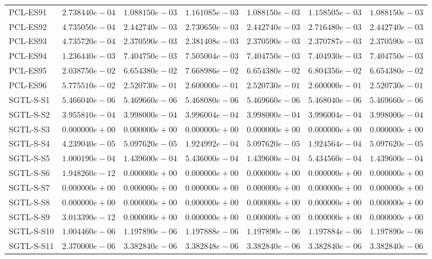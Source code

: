 \begin{longtable}{lrrrrrr}
PCL-ES91 & $2.738440e-04$ & $1.088150e-03$ & $1.161085e-03$ & $1.088150e-03$ & $1.158505e-03$ & $1.088150e-03$ \\
PCL-ES92 & $4.735050e-04$ & $2.442740e-03$ & $2.730650e-03$ & $2.442740e-03$ & $2.716480e-03$ & $2.442740e-03$ \\
PCL-ES93 & $4.735720e-04$ & $2.370590e-03$ & $2.381408e-03$ & $2.370590e-03$ & $2.370787e-03$ & $2.370590e-03$ \\
PCL-ES94 & $1.236440e-03$ & $7.404750e-03$ & $7.505004e-03$ & $7.404750e-03$ & $7.404930e-03$ & $7.404750e-03$ \\
PCL-ES95 & $2.038750e-02$ & $6.654380e-02$ & $7.668986e-02$ & $6.654380e-02$ & $6.804356e-02$ & $6.654380e-02$ \\
PCL-ES96 & $5.775510e-02$ & $2.520730e-01$ & $2.600000e-01$ & $2.520730e-01$ & $2.600000e-01$ & $2.520730e-01$ \\
SGTL-S-S1 & $5.466040e-06$ & $5.469660e-06$ & $5.468080e-06$ & $5.469660e-06$ & $5.468040e-06$ & $5.469660e-06$ \\
SGTL-S-S2 & $3.955810e-04$ & $3.998000e-04$ & $3.996004e-04$ & $3.998000e-04$ & $3.996004e-04$ & $3.998000e-04$ \\
SGTL-S-S3 & $0.000000e+00$ & $0.000000e+00$ & $0.000000e+00$ & $0.000000e+00$ & $0.000000e+00$ & $0.000000e+00$ \\
SGTL-S-S4 & $4.239040e-05$ & $5.097620e-05$ & $1.924992e-04$ & $5.097620e-05$ & $1.924564e-04$ & $5.097620e-05$ \\
SGTL-S-S5 & $1.000190e-04$ & $1.439600e-04$ & $5.436000e-04$ & $1.439600e-04$ & $5.434560e-04$ & $1.439600e-04$ \\
SGTL-S-S6 & $1.948260e-12$ & $0.000000e+00$ & $0.000000e+00$ & $0.000000e+00$ & $0.000000e+00$ & $0.000000e+00$ \\
SGTL-S-S7 & $0.000000e+00$ & $0.000000e+00$ & $0.000000e+00$ & $0.000000e+00$ & $0.000000e+00$ & $0.000000e+00$ \\
SGTL-S-S8 & $0.000000e+00$ & $0.000000e+00$ & $0.000000e+00$ & $0.000000e+00$ & $0.000000e+00$ & $0.000000e+00$ \\
SGTL-S-S9 & $3.013390e-12$ & $0.000000e+00$ & $0.000000e+00$ & $0.000000e+00$ & $0.000000e+00$ & $0.000000e+00$ \\
SGTL-S-S10 & $1.004460e-06$ & $1.197890e-06$ & $1.197888e-06$ & $1.197890e-06$ & $1.197884e-06$ & $1.197890e-06$ \\
SGTL-S-S11 & $2.370000e-06$ & $3.382840e-06$ & $3.382848e-06$ & $3.382840e-06$ & $3.382840e-06$ & $3.382840e-06$ \\

\end{longtable}
